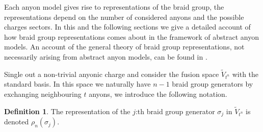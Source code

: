 \documentclass[a4paper,10pt,oneside]{book}
\theoremstyle{plain}
\theoremstyle{definition}
\newtheorem{definition}{Definition}[section]
\theoremstyle{remark}
\begin{document}
Each anyon model gives rise to representations of the braid group, the representations depend on the number of considered anyons and the possible charges sectors. In this and the following sections we give a detailed account of how braid group representations comes about in the framework of abstract anyon models. An account of the general theory of braid group representations, not necessarily arising from abstract anyon models, can be found in \cite{oskar}.

Single out a non-trivial anyonic charge and consider the fusion space $\widetilde{V}_{t^n}$ with the standard basis. In this space we naturally have $n-1$ braid group generators by exchanging neighbouring $t$ anyons, we introduce the following notation.

\begin{definition}\label{def:rho_n sigma_j}
  The representation of the $j$:th braid group generator $σ_j$ in $\widetilde{V}_{t^n}$ is denoted $ρ_n(σ_j)$.
\end{definition}
\end{document}
